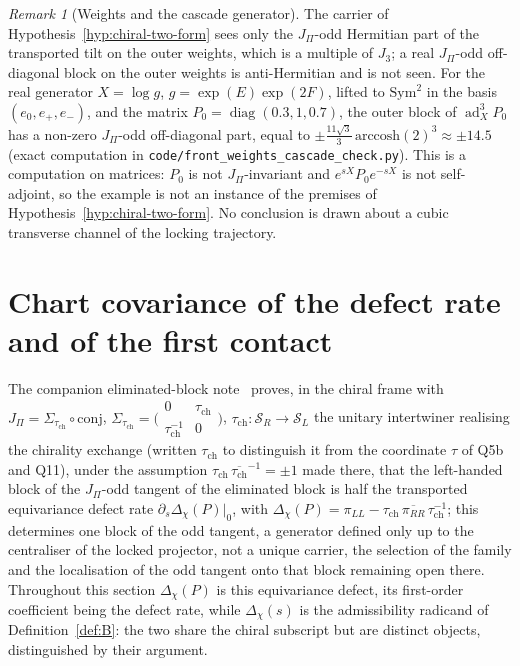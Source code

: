 \documentclass[11pt]{article}
\theoremstyle{definition}
\theoremstyle{remark}
\newtheorem{remark}{Remark}
\newcommand{\JPi}{J_{\Pi}}
\newcommand{\Jthree}{J_{3}}
\newcommand{\Dchi}{\Delta_{\chi}}
\newcommand{\diag}{\operatorname{diag}}
\begin{document}
    \begin{remark}[Weights and the cascade generator]
      \label{rem:path-invariant}
      The carrier of Hypothesis~\ref{hyp:chiral-two-form} sees only the $\JPi$-odd Hermitian part of the transported
      tilt
      on the outer weights, which is a multiple of $\Jthree$; a real $\JPi$-odd off-diagonal block on the outer weights
      is
      anti-Hermitian and is not seen.
      For the real generator $X=\log g$, $g=\exp(E)\exp(2F)$, lifted to $\mathrm{Sym}^2$ in the basis $(e_0,e_+,e_-)$,
      and the matrix $P_0=\diag(0.3,1,0.7)$, the outer block of $\operatorname{ad}_X^3P_0$ has a non-zero $\JPi$-odd
      off-diagonal part, equal to $\pm\tfrac{11\sqrt3}{3}\,\mathrm{arccosh}(2)^3\approx\pm14.5$ (exact computation in
      \texttt{code/front\_weights\_cascade\_check.py}).
      This is a computation on matrices: $P_0$ is not $\JPi$-invariant and $e^{sX}P_0e^{-sX}$ is not self-adjoint, so
      the example is not an instance of the premises of Hypothesis~\ref{hyp:chiral-two-form}.
      No conclusion is drawn about a cubic transverse channel of the locking trajectory.
    \end{remark}

  \section{Chart covariance of the defect rate and of the first contact}
    \label{sec:boundary}

    The companion eliminated-block note~\cite{Beau2026ebj} proves, in the chiral frame with
    $\JPi = \Sigma_{\tau_{\mathrm{ch}}} \circ \mathrm{conj}$, $\Sigma_{\tau_{\mathrm{ch}}} = \bigl(\begin{smallmatrix} 0 & \tau_{\mathrm{ch}} \\ \tau_{\mathrm{ch}}^{-1} & 0
    \end{smallmatrix}\bigr)$, $\tau_{\mathrm{ch}} : \mathcal{S}_R \to \mathcal{S}_L$ the unitary intertwiner realising the chirality exchange (written $\tau_{\mathrm{ch}}$ to distinguish it from the coordinate $\tau$ of Q5b and Q11), under the
    assumption $\tau_{\mathrm{ch}}\,\overline{\tau_{\mathrm{ch}}}^{-1} = \pm 1$ made there, that the left-handed block of the $\JPi$-odd tangent
    of the eliminated block is half the transported equivariance defect rate $\partial_s \Dchi(P)|_0$, with
    $\Dchi(P) = \pi_{LL} - \tau_{\mathrm{ch}}\,\overline{\pi_{RR}}\,\tau_{\mathrm{ch}}^{-1}$; this determines one block of the odd tangent, a generator defined only up to the centraliser of the locked
    projector, not a unique carrier, the selection of the family and the localisation of the odd tangent onto that block
    remaining open there.
    Throughout this section $\Dchi(P)$ is this equivariance defect, its first-order coefficient being the defect rate,
    while $\Dchi(s)$ is the admissibility radicand of Definition~\ref{def:B}: the two share the chiral subscript but
    are distinct objects, distinguished by their argument.
\end{document}
